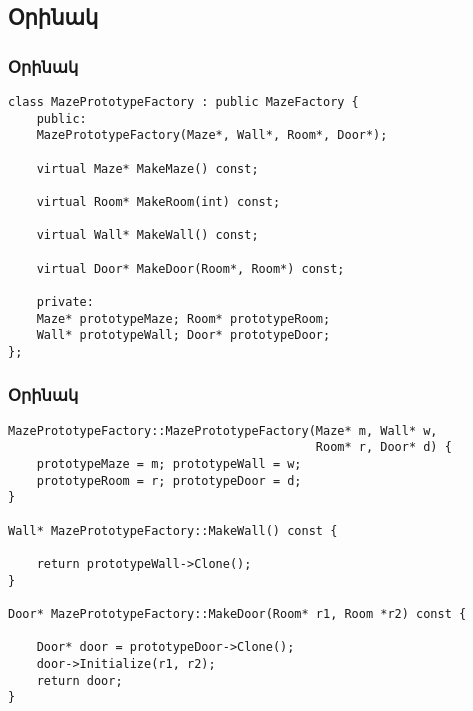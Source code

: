 \documentclass{beamer}
\begin{document}
\subsection{Օրինակ}
\begin{frame}[fragile]\frametitle{Օրինակ}
\begin{english}
\begin{verbatim}
class MazePrototypeFactory : public MazeFactory {
    public:
    MazePrototypeFactory(Maze*, Wall*, Room*, Door*);

    virtual Maze* MakeMaze() const;

    virtual Room* MakeRoom(int) const;

    virtual Wall* MakeWall() const;

    virtual Door* MakeDoor(Room*, Room*) const;

    private:
    Maze* prototypeMaze; Room* prototypeRoom;
    Wall* prototypeWall; Door* prototypeDoor;
};
\end{verbatim}
\end{english}
\end{frame}

\begin{frame}[fragile]\frametitle{Օրինակ}
\begin{english}
\begin{verbatim}
MazePrototypeFactory::MazePrototypeFactory(Maze* m, Wall* w,
                                           Room* r, Door* d) {
    prototypeMaze = m; prototypeWall = w;
    prototypeRoom = r; prototypeDoor = d;
}

Wall* MazePrototypeFactory::MakeWall() const {

    return prototypeWall->Clone();
}

Door* MazePrototypeFactory::MakeDoor(Room* r1, Room *r2) const {

    Door* door = prototypeDoor->Clone();
    door->Initialize(r1, r2);
    return door;
}
\end{verbatim}
\end{english}
\end{frame}
\end{document}

